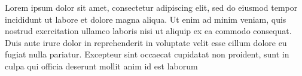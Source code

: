 Lorem ipsum dolor sit amet, consectetur adipiscing elit, sed do eiusmod tempor incididunt ut labore et dolore magna aliqua. Ut enim ad minim veniam, quis nostrud exercitation ullamco laboris nisi ut aliquip ex ea commodo consequat. Duis aute irure dolor in reprehenderit in voluptate velit esse cillum dolore eu fugiat nulla pariatur. Excepteur sint occaecat cupidatat non proident, sunt in culpa qui officia deserunt mollit anim id est laborum


